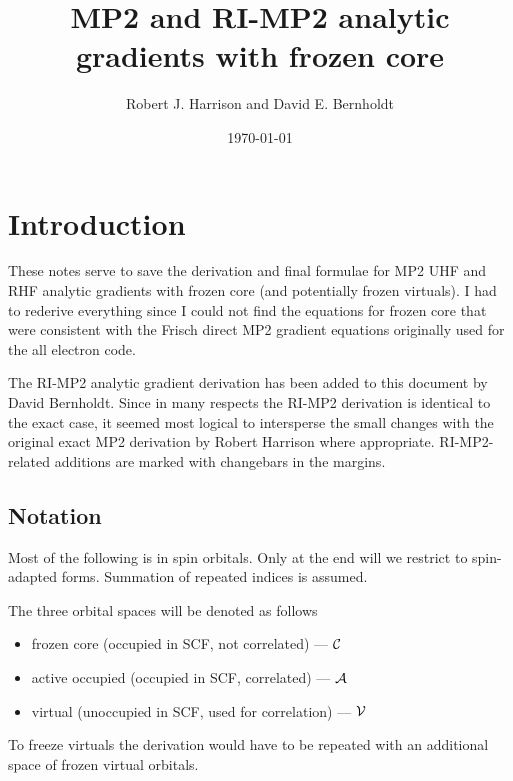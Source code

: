\documentclass[fleqn,12pt]{article}
\title{MP2 and RI-MP2 analytic gradients with frozen core}
\author{Robert J. Harrison and David E. Bernholdt}
\date{\today}
\newcommand{\Core}{{\cal C}}
\newcommand{\Active}{{\cal A}}
\newcommand{\Virtual}{{\cal V}}
\begin{document}
\maketitle

\clearpage

\section{Introduction}

These notes serve to save the derivation and final formulae for MP2
UHF and RHF analytic gradients with frozen core (and potentially
frozen virtuals).  I had to rederive everything since I could not find
the equations for frozen core that were consistent with the Frisch
direct MP2 gradient equations originally used for the all electron
code.

\begin{changebar}
The RI-MP2 analytic gradient derivation has been added to this
document by David Bernholdt.  Since in many respects the RI-MP2
derivation is identical to the exact case, it seemed most logical to
intersperse the small changes with the original exact MP2 derivation
by Robert Harrison where appropriate.  RI-MP2-related additions are
marked with changebars in the margins.
\end{changebar}


\subsection{Notation}

Most of the following is in spin orbitals.  Only at the end will we
restrict to spin-adapted forms.  Summation of repeated indices is
assumed.

The three orbital spaces will be denoted as follows
\begin{itemize}
\item frozen core (occupied in SCF, not correlated) --- $\Core$
\item active occupied (occupied in SCF, correlated) --- $\Active$
\item virtual (unoccupied in SCF, used for correlation) --- $\Virtual$
\end{itemize}
To freeze virtuals the derivation would have to be repeated with an
additional space of frozen virtual orbitals.
\end{document}
